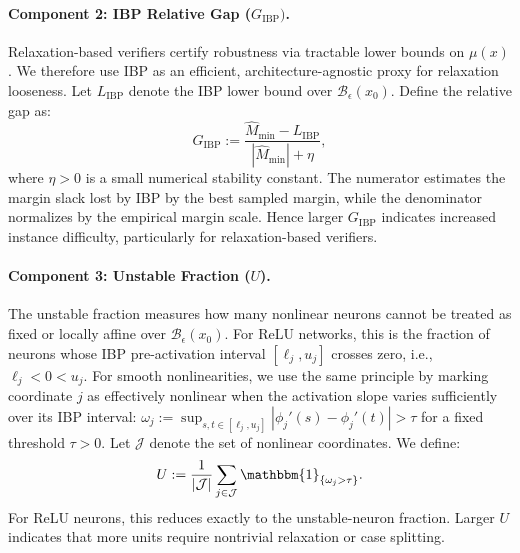 \documentclass{article}
\theoremstyle{definition}
\begin{document}
\paragraph{Component 2: IBP Relative Gap ($G_{\mathrm{IBP}})$.} 
Relaxation-based verifiers certify robustness %
via tractable lower bounds on $\mu(x)$. 
We therefore use IBP as an efficient, architecture-agnostic proxy for relaxation looseness. 
Let $L_{\mathrm{IBP}}$ denote the IBP lower bound %
over $\mathcal{B}_\epsilon(x_0)$. 
Define the %
relative gap as: 
\begin{equation}
    G_{\mathrm{IBP}} := \frac{\widehat{M}_{\min} - L_{\mathrm{IBP}}}{|\widehat{M}_{\min}| + \eta} , 
    \label{IBPgap}
\end{equation}
where $\eta >0$ is a small numerical stability constant. 
The numerator estimates the %
margin slack lost by IBP by the best sampled margin, while the denominator normalizes %
by the empirical margin scale. 
Hence larger $G_{\mathrm{IBP}}$ %
indicates increased instance difficulty, particularly for relaxation-based verifiers.

\paragraph{Component 3: Unstable Fraction ($U$).}
The unstable fraction measures how many nonlinear neurons cannot be treated as fixed or locally affine over $\mathcal B_\epsilon(x_0)$. 
For ReLU networks, this 
is the fraction of neurons whose IBP pre-activation interval $[\ell_j,u_j]$ crosses zero, i.e., $\ell_j<0<u_j$. 
For smooth nonlinearities, we use the same principle by marking coordinate $j$ as effectively nonlinear when the activation slope varies sufficiently over its IBP interval: 
$\omega_j :=\sup_{s,t\in[\ell_j,u_j]} |\phi_j'(s)-\phi_j'(t)| > \tau$ for a fixed threshold $\tau>0$. Let $\mathcal J$ denote the set of nonlinear coordinates. We define: 
\begin{equation}
    U :=
    \frac{1}{|\mathcal J|}
    \sum_{j\in\mathcal J}
    \mathbbm{1}_{\{\omega_j>\tau\}}.
\end{equation}
For ReLU neurons, this reduces exactly to the unstable-neuron fraction. Larger $U$ indicates that more units require nontrivial relaxation or case splitting.
\end{document}
